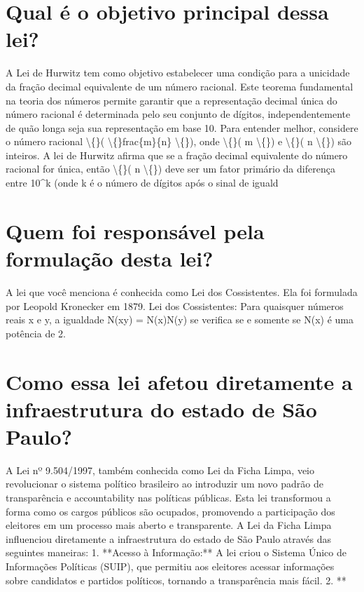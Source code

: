 \documentclass[11pt,a4paper]{article}
\begin{document}
\section{Qual é o objetivo principal dessa lei?}
A Lei de Hurwitz tem como objetivo estabelecer uma condição para a unicidade da fração decimal equivalente de um número racional. Este teorema fundamental na teoria dos números permite garantir que a representação decimal única do número racional é determinada pelo seu conjunto de dígitos, independentemente de quão longa seja sua representação em base 10. Para entender melhor, considere o número racional \textbackslash\{\}( \textbackslash\{\}frac\{m\}\{n\} \textbackslash\{\}), onde \textbackslash\{\}( m \textbackslash\{\}) e \textbackslash\{\}( n \textbackslash\{\}) são inteiros. A lei de Hurwitz afirma que se a fração decimal equivalente do número racional for única, então \textbackslash\{\}( n \textbackslash\{\}) deve ser um fator primário da diferença entre 10^k (onde k é o número de dígitos após o sinal de iguald

\section{Quem foi responsável pela formulação desta lei?}
A lei que você menciona é conhecida como Lei dos Cossistentes. Ela foi formulada por Leopold Kronecker em 1879. Lei dos Cossistentes: Para quaisquer números reais x e y, a igualdade N(xy) = N(x)N(y) se verifica se e somente se N(x) é uma potência de 2.

\section{Como essa lei afetou diretamente a infraestrutura do estado de São Paulo?}
A Lei nº 9.504/1997, também conhecida como Lei da Ficha Limpa, veio revolucionar o sistema político brasileiro ao introduzir um novo padrão de transparência e accountability nas políticas públicas. Esta lei transformou a forma como os cargos públicos são ocupados, promovendo a participação dos eleitores em um processo mais aberto e transparente. A Lei da Ficha Limpa influenciou diretamente a infraestrutura do estado de São Paulo através das seguintes maneiras: 1. **Acesso à Informação:** A lei criou o Sistema Único de Informações Políticas (SUIP), que permitiu aos eleitores acessar informações sobre candidatos e partidos políticos, tornando a transparência mais fácil. 2. **
\end{document}
